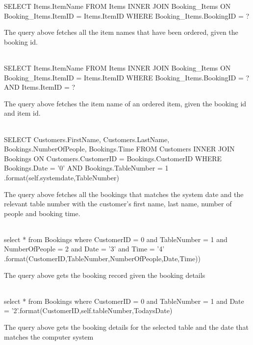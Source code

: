 \begin{sql}
SELECT
Items.ItemName
FROM Items
 INNER JOIN Booking_Items
ON Booking_Items.ItemID = Items.ItemID
WHERE Booking_Items.BookingID = ?
\end{sql}
The query above fetches all the item names that have been ordered, given the  booking id.  \\ \\

\begin{sql}
SELECT
 Items.ItemName
 FROM Items
INNER JOIN Booking_Items
ON Booking_Items.ItemID = Items.ItemID
 WHERE Booking_Items.BookingID = ?
 AND Items.ItemID = ?
\end{sql}
The query above fetches the item name of an ordered item, given the booking id and item id. \\ \\

\begin{sql}
SELECT
 Customers.FirstName,
 Customers.LastName,
 Bookings.NumberOfPeople,
 Bookings.Time
 FROM Customers
INNER JOIN Bookings
ON Customers.CustomerID = Bookings.CustomerID
WHERE Bookings.Date = '{0}'
AND Bookings.TableNumber = {1}
.format(self.systemdate,TableNumber)
\end{sql}
The query above fetches all the bookings that matches the system date and the relevant table number with the customer's first name, last name, number of people and booking time. \\ \\



\begin{sql}
select * from Bookings where CustomerID = {0} and TableNumber = {1} and NumberOfPeople = {2} and Date = '{3}' and Time = '{4}' .format(CustomerID,TableNumber,NumberOfPeople,Date,Time))
\end{sql}
The query above gets the booking record given the booking details \\ \\


\begin{sql}
select * from Bookings where CustomerID = {0} and TableNumber = {1} and Date = '{2}'.format(CustomerID,self.tableNumber,TodaysDate)
\end{sql}
The query above gets the booking details for the selected table and the date that matches the computer system \\ \\


